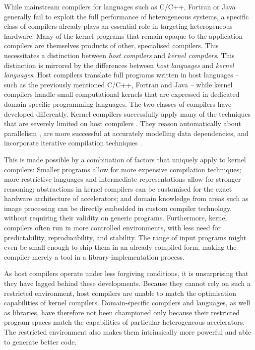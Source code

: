     While mainstream compilers for languages such as C/C++, Fortran or Java
    generally fail to exploit the full performance of heterogeneous systems, a
    specific class of compilers already plays an essential role in
    targeting heterogeneous hardware.
    Many of the kernel programs that remain opaque to the application compilers
    are themselves products of other, specialised compilers.
    This necessitates a distinction between {\em host compilers} and {\em kernel
    compilers}.
    This distinction is mirrored by the differences between {\em host languages}
    and {\em kernel languages}.
    Host compilers translate full programs written in host languages -- such as
    the previously mentioned C/C++, Fortran and Java -- while kernel
    compilers handle small computational kernels that are expressed in dedicated
    domain-specific programming languages.
    The two classes of compilers have developed differently.
    Kernel compilers successfully apply many of the techniques that are severely
    limited on host compilers
    \citep{Murphy2014LimitsOD,Maleki:2011:EVC:2120965.2121464}.
    They reason automatically about parallelism
    \citep{Steuwer:2017:LFD:3049832.3049841}, are more successful at accurately
    modelling data dependencies, and incorporate iterative compilation
    techniques \citep{Ansel:2014:OEF:2628071.2628092}.

    This is made possible by a combination of factors that uniquely apply to
    kernel compilers:
    Smaller programs allow for more expensive compilation techniques;
    more restrictive languages and intermediate representations allow for
    stronger reasoning;
    abstractions in kernel compilers can be customised for the exact hardware
    architecture of accelerators;
    and domain knowledge from areas such as image processing can be directly
    embedded in custom compiler technology, without requiring their validity
    on generic programs.
    Furthermore, kernel compilers often run in more controlled environments,
    with less need for predictability, reproducibility, and stability.
    The range of input programs might even be small enough to ship them in an
    already compiled form, making the compiler merely a tool in a
    library-implementation process.

    As host compilers operate under less forgiving conditions, it is
    unsurprising that they have lagged behind these developments.
    Because they cannot rely on such a restricted environment, host compilers
    are unable to match the optimisation capabilities of kernel compilers.
    Domain-specific compilers and languages, as well as libraries, have
    therefore not been championed only because their restricted program
    spaces match the capabilities of particular heterogeneous accelerators.
    The restricted environment also makes them intrinsically more powerful and
    able to generate better code.

